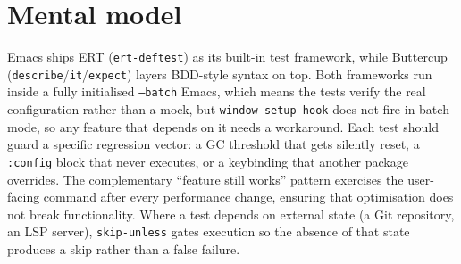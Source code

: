 \section{Mental model}
Emacs ships ERT (\texttt{ert-deftest}) as its built-in test framework,
while Buttercup (\texttt{describe}/\texttt{it}/\texttt{expect}) layers
BDD-style syntax on top.  Both frameworks run inside a fully initialised
\texttt{--batch} Emacs, which means the tests verify the real
configuration rather than a mock, but \texttt{window-setup-hook} does
not fire in batch mode, so any feature that depends on it needs a
workaround.  Each test should guard a specific regression vector: a GC
threshold that gets silently reset, a \texttt{:config} block that never
executes, or a keybinding that another package overrides.  The
complementary ``feature still works'' pattern exercises the user-facing
command after every performance change, ensuring that optimisation does
not break functionality.  Where a test depends on external state (a Git
repository, an LSP server), \texttt{skip-unless} gates execution so the
absence of that state produces a skip rather than a false failure.
